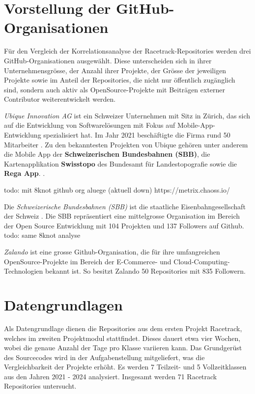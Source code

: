 \section{Vorstellung der GitHub-Organisationen}
\label{sec:VorstellungGithubOrgs}
Für den Vergleich der Korrelationsanalyse der Racetrack-Repositories werden drei GitHub-Organisationen ausgewählt. Diese unterscheiden sich in ihrer Unternehmensgrösse, der Anzahl ihrer Projekte, der Grösse der jeweiligen Projekte sowie im Anteil der Repositories, die nicht nur öffentlich zugänglich sind, sondern auch aktiv als OpenSource-Projekte mit Beiträgen externer Contributor weiterentwickelt werden.

\textit{Ubique Innovation AG} ist ein Schweizer Unternehmen mit Sitz in Zürich, das sich auf die Entwicklung von Softwarelösungen mit Fokus auf Mobile-App-Entwicklung spezialisiert hat. Im Jahr 2021 beschäftigte die Firma rund 50 Mitarbeiter \cite{noauthor_mathias_2021}. Zu den bekanntesten Projekten von Ubique gehören unter anderem die Mobile App der \textbf{Schweizerischen Bundesbahnen (SBB)}, die Kartenapplikation \textbf{Swisstopo} des Bundesamt für Landestopografie sowie die \textbf{Rega App}. \parencite{noauthor_apps_nodate}.

todo: mit 8knot github org aluege (aktuell down) 
https://metrix.chaoss.io/

Die \textit{Schweizerische Bundesbahnen (SBB)} ist die staatliche Eisenbahngesellschaft der Schweiz \parencite{uvek_verkehr_energie_und_kommunikation_eidgenossisches_departement_fur_umwelt_schweizerische_nodate}. Die SBB repräsentiert eine mittelgrosse Organisation im Bereich der Open Source Entwicklung mit 104 Projekten und 137 Followers auf Github. \parencite{noauthor_swiss_nodate} 
todo: same 8knot analyse

\textit{Zalando} ist eine grosse Github-Organisation, die für ihre umfangreichen OpenSource-Projekte im Bereich der E-Commerce- und Cloud-Computing-Technologien bekannt ist. So besitzt Zalando 50 Repositories mit 835 Followern. \parencite{noauthor_zalando_nodate}


\section{Datengrundlagen}
\label{sec:Datengrundlagen}
Als Datengrundlage dienen die Repositories aus dem ersten Projekt Racetrack, welches im zweiten Projektmodul stattfindet. Dieses dauert etwa vier Wochen, wobei die genaue Anzahl der Tage pro Klasse variieren kann. Das Grundgerüst des Sourcecodes wird in der Aufgabenstellung mitgeliefert, was die Vergleichbarkeit der Projekte erhöht. Es werden 7 Teilzeit- und 5 Vollzeitklassen aus den Jahren 2021 - 2024 analysiert. Insgesamt werden 71 Racetrack Repositories untersucht. 
